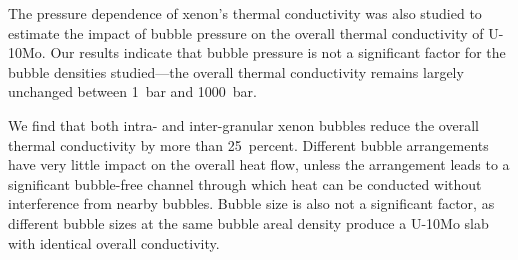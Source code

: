 The pressure dependence of xenon's thermal conductivity was also studied to estimate the impact of bubble pressure on the overall thermal conductivity of U-10Mo. Our results indicate that bubble pressure is not a significant factor for the bubble densities studied---the overall thermal conductivity remains largely unchanged between 1~bar and 1000~bar.

We find that both intra- and inter-granular xenon bubbles reduce the overall thermal conductivity by more than 25~percent. Different bubble arrangements have very little impact on the overall heat flow, unless the arrangement leads to a significant bubble-free channel through which heat can be conducted without interference from nearby bubbles. Bubble size is also not a significant factor, as different bubble sizes at the same bubble areal density produce a U-10Mo slab with identical overall conductivity.





